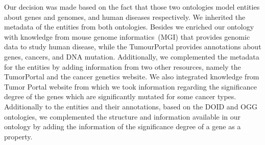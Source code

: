 \hspace*{3.5mm} Our decision was made based on the fact that those two ontologies model entities about genes and genomes, and human diseases respectively. We inherited the metadata of the entities from both ontologies. Besides we enriched our ontology with knowledge from mouse genome informatics~(MGI) that provides genomic data to study human disease, while the TumourPortal provides annotations about genes, cancers, and DNA mutation. Additionally, we complemented the metadata for the entities by adding information from two other resources, namely the TumorPortal and the cancer genetics website. We also integrated knowledge from Tumor Portal website from which we took information regarding the significance degree of the genes which are significantly mutated for some cancer types. Additionally to the entities and their annotations, based on the DOID and OGG ontologies, we complemented the structure and information available in our ontology by adding the information of the significance degree of a gene as a property. 

